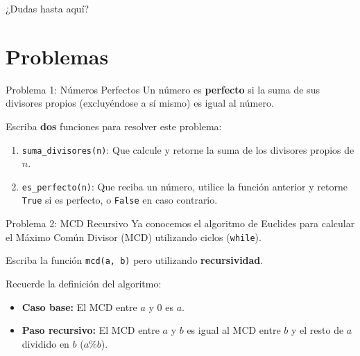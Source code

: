\documentclass[aspectratio=169, 11pt]{beamer}
\begin{document}
	\begin{frame}[standout]
		¿Dudas hasta aquí?
	\end{frame}
	
	\section{Problemas}
	
	\begin{frame}{Problema 1: Números Perfectos}
		Un número es \textbf{perfecto} si la suma de sus divisores propios (excluyéndose a sí mismo) es igual al número.
		
		Escriba \textbf{dos} funciones para resolver este problema:
		\begin{enumerate}
			\item \lstinline{suma_divisores(n)}: Que calcule y retorne la suma de los divisores propios de $n$.
			\item \lstinline{es_perfecto(n)}: Que reciba un número, utilice la función anterior y retorne \lstinline{True} si es perfecto, o \lstinline{False} en caso contrario.
		\end{enumerate}
	\end{frame}
	
	\begin{frame}{Problema 2: MCD Recursivo}
		Ya conocemos el algoritmo de Euclides para calcular el Máximo Común Divisor (MCD) utilizando ciclos (\lstinline{while}).
		
		Escriba la función \lstinline{mcd(a, b)} pero utilizando \textbf{recursividad}.
		
		\vspace{0.5cm}
		Recuerde la definición del algoritmo:
		\begin{itemize}
			\item \textbf{Caso base:} El MCD entre $a$ y $0$ es $a$.
			\item \textbf{Paso recursivo:} El MCD entre $a$ y $b$ es igual al MCD entre $b$ y el resto de $a$ dividido en $b$ ($a \% b$).
		\end{itemize}
	\end{frame}
	
\end{document}

